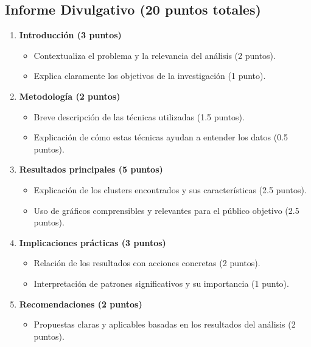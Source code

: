 \documentclass[a4,11pt]{aleph-notas}
\begin{document}
\subsection*{Informe Divulgativo (20 puntos totales)}
\begin{enumerate}[leftmargin=*, label=\textbf{\arabic*.}]
    \item \textbf{Introducción (3 puntos)}
    \begin{itemize}[leftmargin=*]
        \item Contextualiza el problema y la relevancia del análisis (2 puntos).
        \item Explica claramente los objetivos de la investigación (1 punto).
    \end{itemize}

    \item \textbf{Metodología (2 puntos)}
    \begin{itemize}[leftmargin=*]
        \item Breve descripción de las técnicas utilizadas  (1.5 puntos).
        \item Explicación de cómo estas técnicas ayudan a entender los datos (0.5 puntos).
    \end{itemize}

    \item \textbf{Resultados principales (5 puntos)}
    \begin{itemize}[leftmargin=*]
        \item Explicación de los clusters encontrados y sus características (2.5 puntos).
        \item Uso de gráficos comprensibles y relevantes para el público objetivo (2.5 puntos).
    \end{itemize}

    \item \textbf{Implicaciones prácticas (3 puntos)}
    \begin{itemize}[leftmargin=*]
        \item Relación de los resultados con acciones concretas (2 puntos).
        \item Interpretación de patrones significativos y su importancia (1 punto).
    \end{itemize}

    \item \textbf{Recomendaciones (2 puntos)}
    \begin{itemize}[leftmargin=*]
        \item Propuestas claras y aplicables basadas en los resultados del análisis (2 puntos).
    \end{itemize}


\end{enumerate}
\end{document}
